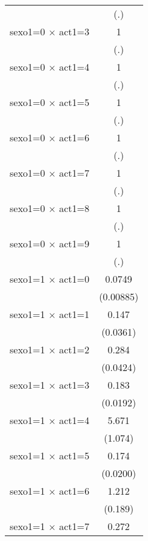 {\begin{tabular}{l*{1}{c}}
                    &         (.)         \\
[1em]
sexo1=0 $\times$ act1=3&           1         \\
                    &         (.)         \\
[1em]
sexo1=0 $\times$ act1=4&           1         \\
                    &         (.)         \\
[1em]
sexo1=0 $\times$ act1=5&           1         \\
                    &         (.)         \\
[1em]
sexo1=0 $\times$ act1=6&           1         \\
                    &         (.)         \\
[1em]
sexo1=0 $\times$ act1=7&           1         \\
                    &         (.)         \\
[1em]
sexo1=0 $\times$ act1=8&           1         \\
                    &         (.)         \\
[1em]
sexo1=0 $\times$ act1=9&           1         \\
                    &         (.)         \\
[1em]
sexo1=1 $\times$ act1=0&      0.0749\sym{***}\\
                    &   (0.00885)         \\
[1em]
sexo1=1 $\times$ act1=1&       0.147\sym{***}\\
                    &    (0.0361)         \\
[1em]
sexo1=1 $\times$ act1=2&       0.284\sym{***}\\
                    &    (0.0424)         \\
[1em]
sexo1=1 $\times$ act1=3&       0.183\sym{***}\\
                    &    (0.0192)         \\
[1em]
sexo1=1 $\times$ act1=4&       5.671\sym{***}\\
                    &     (1.074)         \\
[1em]
sexo1=1 $\times$ act1=5&       0.174\sym{***}\\
                    &    (0.0200)         \\
[1em]
sexo1=1 $\times$ act1=6&       1.212         \\
                    &     (0.189)         \\
[1em]
sexo1=1 $\times$ act1=7&       0.272\sym{***}\\

\end{tabular}}
